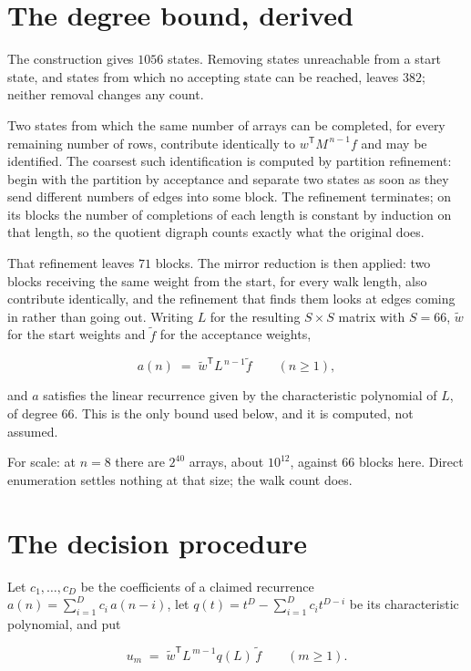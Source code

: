 \documentclass[11pt]{article}
\theoremstyle{definition}
\begin{document}
\section{The degree bound, derived}

The construction gives $1056$ states. Removing states unreachable from a start state, and states from which no accepting state can be reached, leaves $382$; neither removal changes any count.

Two states from which the same number of arrays can be completed, for every remaining number of rows, contribute identically to $w^{\mathsf T}M^{\,n-1}f$ and may be identified. The coarsest such identification is computed by partition refinement: begin with the partition by acceptance and separate two states as soon as they send different numbers of edges into some block. The refinement terminates; on its blocks the number of completions of each length is constant by induction on that length, so the quotient digraph counts exactly what the original does.

That refinement leaves $71$ blocks. The mirror reduction is then applied: two blocks receiving the same weight from the start, for every walk length, also contribute identically, and the refinement that finds them looks at edges coming in rather than going out. Writing $L$ for the resulting $S \times S$ matrix with $S = 66$, $\tilde w$ for the start weights and $\tilde f$ for the acceptance weights,

\[a(n) \;=\; \tilde w^{\mathsf T} L^{\,n-1} \tilde f \qquad (n \ge 1),\]

and $a$ satisfies the linear recurrence given by the characteristic polynomial of $L$, of degree $66$. This is the only bound used below, and it is computed, not assumed.

For scale: at $n = 8$ there are $2^{40}$ arrays, about $10^{12}$, against $66$ blocks here. Direct enumeration settles nothing at that size; the walk count does.

\section{The decision procedure}

Let $c_1,\dots,c_D$ be the coefficients of a claimed recurrence $a(n) = \sum_{i=1}^{D} c_i\,a(n-i)$, let $q(t) = t^{D} - \sum_{i=1}^{D} c_i t^{D-i}$ be its characteristic polynomial, and put

\[u_m \;=\; \tilde w^{\mathsf T} L^{\,m-1} q(L)\,\tilde f \qquad (m \ge 1).\]
\end{document}
